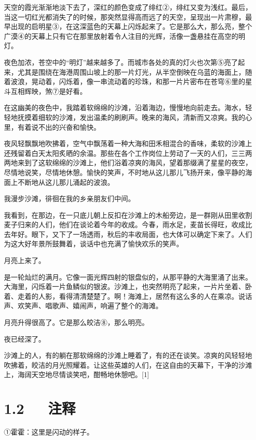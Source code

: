 \documentclass[letterpaper,12pt,english]{sphinxmanual}
\begin{document}
天空的霞光渐渐地淡下去了，深红的颜色变成了绯红②，绯红又变为浅红。最后，当这一切红光都消失了的时候，那突然显得高而远了的天空，呈现出一片肃穆，最早出现的启明星③，在这深蓝色的天幕上闪烁起来了。它是那么大，那么亮，整个广漠④的天幕上只有它在那里放射着令人注目的光辉，活像一盏悬挂在高空的明灯。

夜色加浓，苍空中的“明灯”越来越多了。而城市各处的真的灯火也次第⑤亮了起来，尤其是围绕在海港周围山坡上的那一片灯光，从半空倒映在乌蓝的海面上，随着波浪，晃动着，闪烁着，像一串流动着的珍珠，和那一片片密布在苍穹⑥里的星斗互相辉映，煞⑦是好看。

在这幽美的夜色中，我踏着软绵绵的沙滩，沿着海边，慢慢地向前走去。海水，轻轻地抚摸着细软的沙滩，发出温柔的刷刷声。晚来的海风，清新而又凉爽。我的心里，有着说不出的兴奋和愉快。

夜风轻飘飘地吹拂着，空气中飘荡着一种大海和田禾相混合的香味，柔软的沙滩上还残留着白天太阳炙晒的余温。那些在各个工作岗位上劳动了一天的人们，三三两两地来到了这软绵绵的沙滩上，他们浴着凉爽的海风，望着那缀满了星星的夜空，尽情地说笑，尽情地休憩。愉快的笑声，不时地从这儿那儿飞扬开来，像平静的海面上不断地从这儿那儿涌起的波浪。

我漫步沙滩，徘徊在我的乡亲朋友们中间。

我看到，在那边，在一只底儿朝上反扣在沙滩上的木船旁边，是一群刚从田里收割麦子归来的人们，他们在谈论着今年的收成。今春，雨水足，麦苗长得旺，收成比去年好。眼下，又下了一场透雨，秋后的丰收局面，也大体可以确定下来了。人们为这大好年景所鼓舞着，谈话中也充满了愉快欢乐的笑声。

月亮上来了。

是一轮灿烂的满月。它像一面光辉四射的银盘似的，从那平静的大海里涌了出来。大海里，闪烁着一片鱼鳞似的银波。沙滩上，也突然明亮了起来，一片片坐着、卧着、走着的人影，看得清清楚楚了。啊！海滩上，居然有这么多的人在乘凉。说话声、欢笑声、唱歌声、嬉闹声，响遍了整个的海滩。

月亮升得很高了。它是那么皎洁⑧，那么明亮。

夜已经深了。

沙滩上的人，有的躺在那软绵绵的沙滩上睡着了，有的还在谈笑。凉爽的风轻轻地吹拂着，皎洁的月光照耀着。让这些英雄的人们，在这自由的天幕下，干净的沙滩上，海阔天空地尽情谈笑吧，酣畅地休憩吧。{[}1{]}


\section{1.2   注释}
\label{\detokenize{p01_u6563_u6587/_u5cfb_u9752-_u6d77_u6ee8_u4ef2_u590f_u591c:id4}}
①霍霍：这里是闪动的样子。
\end{document}
